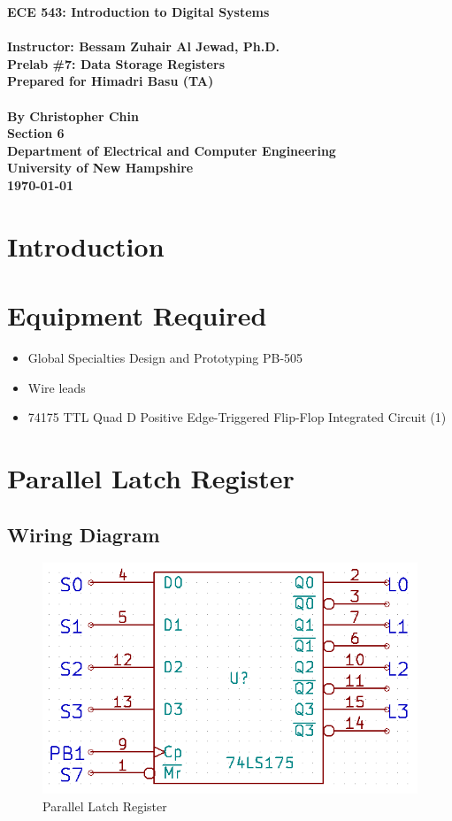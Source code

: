 \documentclass[11pt,a4paper]{article}
\begin{document}
\begin{center}
\textbf{
    \Large{ECE 543: Introduction to Digital Systems}
    \\~\\
    \large{Instructor: Bessam Zuhair Al Jewad, Ph.D.}
    \\[1.25in]
    \LARGE{Prelab \#7: Data Storage Registers}
    \\[0.62in]
    \large{Prepared for Himadri Basu (TA)\\~\\By Christopher Chin}
    \\[1.25in]
    \LARGE{Section 6}
    \\[1.25in]
    \Large{Department of Electrical and Computer Engineering\\
           University of New Hampshire}
    \\[1.25in]
    \Large{\today}
}
\end{center}
\clearpage
{}

\tableofcontents
\pagebreak

\section{Introduction}
\section{Equipment Required}
\begin{itemize}
    \item Global Specialties Design and Prototyping PB-505
    \item Wire leads
    \item 74175 TTL Quad D Positive Edge-Triggered Flip-Flop Integrated Circuit (1)
\end{itemize}
\section{Parallel Latch Register}
\subsection{Wiring Diagram}
\begin{figure}[H]
    \centering
    \includegraphics[width=5in]{parallel.png}
    \caption{Parallel Latch Register}
\end{figure}
\end{document}

